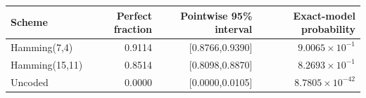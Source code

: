 \begin{tabular}{lrrr}
\toprule
Scheme & Perfect fraction & Pointwise 95\% interval & Exact-model probability \\
\midrule
Hamming(7,4) & 0.9114 & [0.8766,0.9390] & $9.0065\times10^{-1}$ \\
Hamming(15,11) & 0.8514 & [0.8098,0.8870] & $8.2693\times10^{-1}$ \\
Uncoded & 0.0000 & [0.0000,0.0105] & $8.7805\times10^{-42}$ \\
\bottomrule
\end{tabular}
